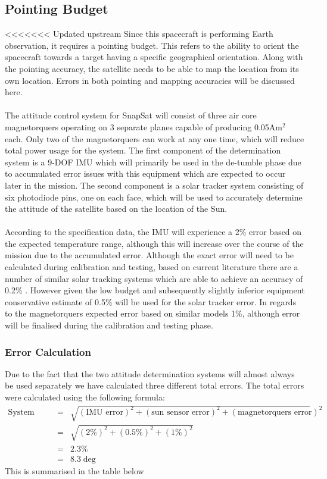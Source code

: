 \subsection{Pointing Budget}
<<<<<<< Updated upstream
Since this spacecraft is performing Earth observation, it requires a pointing budget. This refers to the ability to orient the spacecraft towards a target having a specific geographical orientation. Along with the pointing accuracy, the satellite needs to be able to map the location from its own location. Errors in both pointing and mapping accuracies will be discussed here. \\
\\\noindent
The attitude control system for SnapSat will consist of three air core magnetorquers operating on 3 separate planes capable of producing 0.05Am$^2$ each.  Only two of the magnetorquers can work at any one time, which will reduce total power usage for the system.  The first component of the determination system is a 9-DOF IMU which will primarily be used in the de-tumble phase due to accumulated error issues with this equipment which are expected to occur later in the mission.  The second component is a solar tracker system consisting of six photodiode pins, one on each face, which will be used to accurately determine the attitude of the satellite based on the location of the Sun. \\
\\\noindent
According to the specification data, the IMU will experience a 2\% error based on the expected temperature range, although this will increase over the course of the mission due to the accumulated error.  Although the exact error will need to be calculated during calibration and testing, based on current literature there are a number of similar solar tracking systems which are able to achieve an accuracy of 0.2\% \cite{beaudette}.  However given the low budget and subsequently slightly inferior equipment conservative estimate of 0.5\% will be used for the solar tracker error.  In regards to the magnetorquers expected error based on similar models 1\%, although error will be finalised during the calibration and testing phase.
\subsubsection{Error Calculation}
Due to the fact that the two attitude determination systems will almost always be used separately we have calculated three different total errors. The total errors were calculated using the following formula:
\begin{eqnarray}
\text{System Error} &=& \sqrt{(\text{IMU error})^2+(\text{sun sensor error})^2+(\text{magnetorquers error})^2} \\
&=& \sqrt{(2\%)^2+(0.5\%)^2+(1\%)^2} \\
&=& 2.3\% \\
&=& 8.3\deg
\end{eqnarray}
This is summarised in the table below

